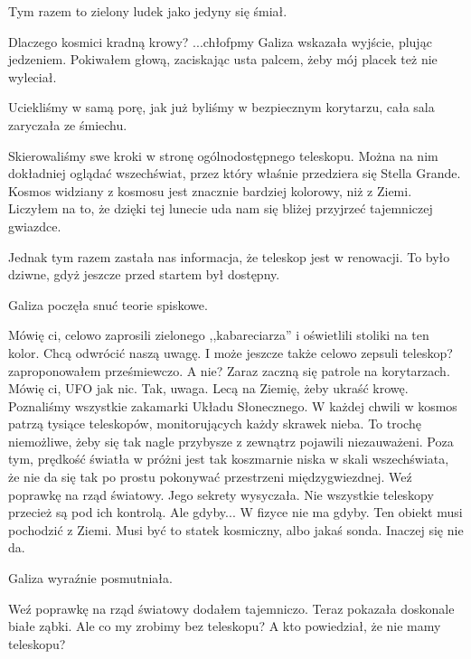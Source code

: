 Tym razem to zielony ludek jako jedyny się śmiał.

\begin{dialogue}
	\ds{} Dlaczego kosmici kradną krowy?
	\ds{} ...chłofpmy \dm{} Galiza wskazała wyjście, plując jedzeniem. Pokiwałem głową, zaciskając usta palcem, żeby mój placek też nie wyleciał.
\end{dialogue}

Uciekliśmy w samą porę, jak już byliśmy w bezpiecznym korytarzu, cała sala zaryczała ze śmiechu.

Skierowaliśmy swe kroki w stronę ogólnodostępnego teleskopu.
Można na nim dokładniej oglądać wszechświat, przez który właśnie przedziera się Stella Grande.
Kosmos widziany z kosmosu jest znacznie bardziej kolorowy, niż z Ziemi.
Liczyłem na to, że dzięki tej lunecie uda nam się bliżej przyjrzeć tajemniczej gwiazdce.

Jednak tym razem zastała nas informacja, że teleskop jest w renowacji.
To było dziwne, gdyż jeszcze przed startem był dostępny.

Galiza poczęła snuć teorie spiskowe.
\begin{dialogue}
	\ds{} Mówię ci, celowo zaprosili zielonego ,,kabareciarza'' i oświetlili stoliki na ten kolor. Chcą odwrócić naszą uwagę.
	\ds{} I może jeszcze także celowo zepsuli teleskop? \dm{} zaproponowałem prześmiewczo.
	\ds{} A nie? Zaraz zaczną się patrole na korytarzach. Mówię ci, UFO jak nic.
	\ds{} Tak, uwaga. Lecą na Ziemię, żeby ukraść krowę. Poznaliśmy wszystkie zakamarki Układu Słonecznego. W każdej chwili w kosmos patrzą tysiące teleskopów, monitorujących każdy skrawek nieba. To trochę niemożliwe, żeby się tak nagle przybysze z zewnątrz pojawili niezauważeni. Poza tym, prędkość światła w próżni jest tak koszmarnie niska w skali wszechświata, że nie da się tak po prostu pokonywać przestrzeni międzygwiezdnej.
	\ds{} Weź poprawkę na rząd światowy. Jego sekrety \dm{} wysyczała.
	\ds{} Nie wszystkie teleskopy przecież są pod ich kontrolą. 
	\ds{} Ale gdyby...
	\ds{} W fizyce nie ma gdyby. Ten obiekt musi pochodzić z Ziemi. Musi być to statek kosmiczny, albo jakaś sonda. Inaczej się nie da.
\end{dialogue}

Galiza wyraźnie posmutniała.

\begin{dialogue}
	\ds{} Weź poprawkę na rząd światowy \dm{} dodałem tajemniczo. Teraz pokazała doskonale białe ząbki.
	\ds{} Ale co my zrobimy bez teleskopu?
	\ds{} A kto powiedział, że nie mamy teleskopu?
\end{dialogue}

